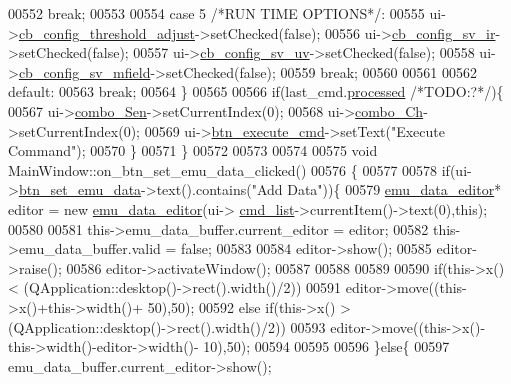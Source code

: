 \begin{DoxyCode}
00552         \textcolor{keywordflow}{break};
00553 
00554         \textcolor{keywordflow}{case} 5 \textcolor{comment}{/*RUN TIME OPTIONS*/}:
00555              ui->\hyperlink{a00027_a433ffc427e1103e6c2939f949ee5e5b5}{cb\_config\_threshold\_adjust}->setChecked(\textcolor{keyword}{false});
00556              ui->\hyperlink{a00027_a4db3ccfbbf8c5222dd2f042d3073bbe8}{cb\_config\_sv\_ir}->setChecked(\textcolor{keyword}{false});
00557              ui->\hyperlink{a00027_a3a93cd0a3f3738aad252d063a8677839}{cb\_config\_sv\_uv}->setChecked(\textcolor{keyword}{false});
00558              ui->\hyperlink{a00027_a0a83284035ab2dbaeb39946522434986}{cb\_config\_sv\_mfield}->setChecked(\textcolor{keyword}{false});
00559         \textcolor{keywordflow}{break};
00560 
00561 
00562     \textcolor{keywordflow}{default}:
00563         \textcolor{keywordflow}{break};
00564     \}
00565 
00566     \textcolor{keywordflow}{if}(last\_cmd.\hyperlink{a00001_a3e88f779da9798a5da7dda227e2ca388}{processed} \textcolor{comment}{/*TODO:?*/})\{
00567     ui->\hyperlink{a00027_ad95005b5fcac8126171019298147b285}{combo\_Sen}->setCurrentIndex(0);
00568     ui->\hyperlink{a00027_a263fb43f2eff37a44ff7359ba41e2eeb}{combo\_Ch}->setCurrentIndex(0);
00569     ui->\hyperlink{a00027_a9ea50d44e38316e4203933698cbc14a6}{btn\_execute\_cmd}->setText(\textcolor{stringliteral}{"Execute Command"});
00570     \}
00571 \}
00572 
00573 
00574 
00575 \textcolor{keywordtype}{void} MainWindow::on\_btn\_set\_emu\_data\_clicked()
00576 \{
00577 
00578     \textcolor{keywordflow}{if}(ui->\hyperlink{a00027_ad05944ce9c8afb0ab60549a326b8e0af}{btn\_set\_emu\_data}->text().contains(\textcolor{stringliteral}{"Add Data"}))\{
00579     \hyperlink{a00004}{emu\_data\_editor}* editor = \textcolor{keyword}{new} \hyperlink{a00004}{emu\_data\_editor}(ui->
      \hyperlink{a00027_aa66ece71395b435e915d384fb63bac1d}{cmd\_list}->currentItem()->text(0),\textcolor{keyword}{this});
00580 
00581     this->emu\_data\_buffer.current\_editor = editor;
00582     this->emu\_data\_buffer.valid          = \textcolor{keyword}{false};
00583 
00584     editor->show();
00585     editor->raise();
00586     editor->activateWindow();
00587 
00588 
00589 
00590     \textcolor{keywordflow}{if}(this->x() < (QApplication::desktop()->rect().width()/2))
00591     editor->move((this->x()+this->width()+ 50),50);
00592     \textcolor{keywordflow}{else} \textcolor{keywordflow}{if}(this->x() > (QApplication::desktop()->rect().width()/2))
00593     editor->move((this->x()-this->width()-editor->width()- 10),50);
00594 
00595 
00596  \}\textcolor{keywordflow}{else}\{
00597       emu\_data\_buffer.current\_editor->show();

\end{DoxyCode}

